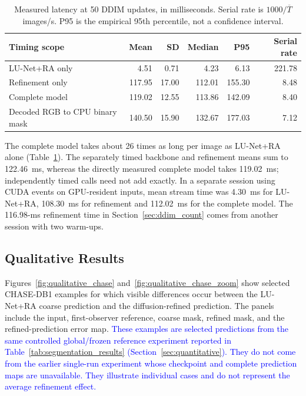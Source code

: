 \documentclass[jimaging,article,submit,pdftex,moreauthors]
  {Definitions/mdpi}
\DeclareRobustCommand{\rev}[1]{\textcolor{blue}{#1}}
\newcommand{\revbegin}{\begingroup\color{blue}}
\DeclareRobustCommand{\rev}[1]{#1}
\newcommand{\revbegin}{\begingroup}
\newcommand{\revend}{\ifhmode\par\fi\endgroup}
\providecommand{\linelabel}[1]{}
\newcommand{\seclabel}[1]{\linelabel{rev:sec:#1}}
\newcommand{\secend}[1]{\linelabel{rev:end:#1}}
\begin{document}
\begin{table}[htbp]\revbegin{}
\centering
\caption{Measured latency at 50 DDIM updates, in milliseconds. Serial rate is $1000/\overline{T}$ images/s. P95 is the empirical 95th percentile, not a confidence interval.}
\label{tab:latency}
\small
\begin{tabular}{lrrrrr}
\toprule
Timing scope & Mean & SD & Median & P95 & Serial rate \\
\midrule
LU-Net+RA only & 4.51 & 0.71 & 4.23 & 6.13 & 221.78 \\
Refinement only & 117.95 & 17.00 & 112.01 & 155.30 & 8.48 \\
Complete model & 119.02 & 12.55 & 113.86 & 142.09 & 8.40 \\
Decoded RGB to CPU binary mask & 140.50 & 15.90 & 132.67 & 177.03 & 7.12 \\
\bottomrule
\end{tabular}
\revend{}\end{table}

The complete model takes about 26 times as long per image as LU-Net+RA alone (Table~\ref{tab:latency}). The separately timed backbone and refinement means sum to 122.46~ms, whereas the directly measured complete model takes 119.02~ms; independently timed calls need not add exactly. In a separate session using CUDA events on GPU-resident inputs, mean stream time was 4.30~ms for LU-Net+RA, 108.30~ms for refinement and 112.02~ms for the complete model. The 116.98-ms refinement time in Section~\ref{sec:ddim_count} comes from another session with two warm-ups.\secend{latency}\revend{}

\subsection{Qualitative Results}
\label{sec:qualitative}
\seclabel{qualitative}

Figures~\ref{fig:qualitative_chase} and~\ref{fig:qualitative_chase_zoom} show selected CHASE-DB1 examples for which visible differences occur between the LU-Net+RA coarse prediction and the diffusion-refined prediction. The panels include the input, first-observer reference, coarse mask, refined mask, and the refined-prediction error map. \rev{These examples are selected predictions from the same controlled global/frozen reference experiment reported in Table~\ref{tab:segmentation_results} (Section~\ref{sec:quantitative}). They do not come from the earlier single-run experiment whose checkpoint and complete prediction maps are unavailable. They illustrate individual cases and do not represent the average refinement effect.}
\end{document}
